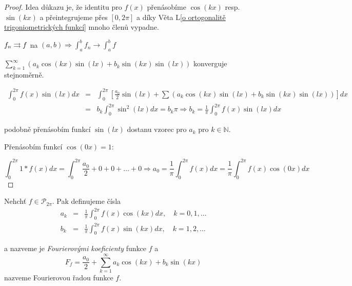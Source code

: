 \begin{proof}
Idea důkazu je, že identitu pro $f(x)$ přenásobíme $\cos(kx)$ resp. $\sin(kx)$  a přeintegrujeme přes $[0, 2 \pi]$ a díky Věta L\ref{o ortogonalitě trigoniometrických funkcí} mnoho členů vypadne.

\begin{opakovani}
$f_n \rightrightarrows f$ na $(a,b) \Rightarrow \int_a^b f_n \rightarrow \int_a^b f$
\end{opakovani}

\begin{pozorovani}
$\sum_{k=1}^{\infty} \left( a_k \cos(kx) \sin(lx) + b_k \sin(kx) \sin(lx) \right)$ konverguje stejnoměrně.
\end{pozorovani}

\begin{eqnarray*}
\int_{0}^{2 \pi} f(x) \sin(lx) dx & = & \int_{0}^{2 \pi} \left[ \frac{a_0}{2} \sin(lx) + \sum \left( a_k \cos(kx) \sin(lx) + b_k \sin(kx) \sin(lx) \right) \right] dx \\
& = & b_k \int_{0}^{2 \pi} \sin^2(lx) dx = b_k \pi \Rightarrow b_k = \frac{1}{\pi} \int_0^{2 \pi} f(x) \sin(lx) dx
\end{eqnarray*}

podobně přenásobím funkcí $\sin(lx)$ dostanu vzorec pro $a_k$ pro $k \in \mathbb{N}$.

Přenásobím funkcí $\cos(0x) = 1$:

$$\int_{0}^{2 \pi} 1 * f(x) dx = \int_{0}^{2 \pi} \frac{a_0}{2}+0+0+\ldots+0 \Rightarrow a_0 = \frac{1}{\pi} \int_{0}^{2 \pi} f(x) dx = \frac{1}{\pi} \int_0^{2 \pi} f(x) \cos(0x) dx$$

\end{proof}

\begin{definice}
Nehchť $f \in \mathcal{P}_{2 \pi}$. Pak definujeme čísla
\begin{eqnarray*}
a_k & = & \frac{1}{\pi} \int_{0}^{2 \pi} f(x) \cos(kx) dx, \quad k=0,1,\ldots \\
b_k & = & \frac{1}{\pi} \int_{0}^{2 \pi} f(x) \sin(kx) dx, \quad k=1,2,\ldots 
\end{eqnarray*}

a nazveme je \emph{Fourierovými koeficienty} funkce $f$ a 
$$F_f = \frac{a_0}{2} + \sum_{k=1}^\infty a_k \cos(kx) + b_k \sin(kx)$$
nazveme Fourierovou řadou funkce $f$.
\end{definice}

